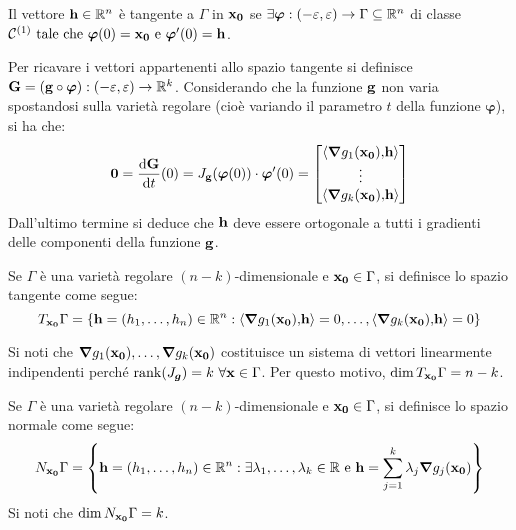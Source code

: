 \begin{definition}
    Il vettore $\vb{h} \in \mathbb{R}^n$ è tangente a $\Gamma$ in $\vb{x_0}$ se $\exists \bm\varphi: (-\varepsilon, \varepsilon) \to \Gamma \subseteq \mathbb{R}^n$ di classe $\mathcal{C}^{(1)} \text{ tale che } \bm\varphi (0) = \vb{x_0} \text{ e } \bm\varphi ' (0) = \vb{h}$.
\end{definition}

Per ricavare i vettori appartenenti allo spazio tangente si definisce $\vb{G}=(\vb{g}\circ\bm\varphi):(-\varepsilon,\varepsilon)\to\mathbb{R}^k$. Considerando che la funzione $\vb{g}$ non varia spostandosi sulla varietà regolare (cioè variando il parametro $t$ della funzione $\bm\varphi$), si ha che:
$$
    \vb{0}=\frac{\dd \vb{G}}{\dd t}(0)=J_{\vb{g}}(\bm\varphi(0))\cdot \bm\varphi'(0)=
    \begin{bmatrix}
        \left\langle\grad g_1(\vb{x_0}){,}\vb{h}\right\rangle\\
        \vdots\\
        \left\langle\grad g_k(\vb{x_0}){,}\vb{h}\right\rangle
    \end{bmatrix}
$$
Dall'ultimo termine si deduce che $\vb{h}$ deve essere ortogonale a tutti i gradienti delle componenti della funzione $\vb{g}$.

\begin{definition}
    Se $\Gamma$ è una varietà regolare $(n-k)$-dimensionale e $\vb{x_0} \in \Gamma$, si definisce lo spazio tangente come segue:
    $$
        T_{\vb{x_0}}\Gamma = \{ \vb{h}=(h_1,\dots,h_n) \in \mathbb{R}^n : \left\langle\grad g_1(\vb{x_0}){,}\vb{h}\right\rangle=0,\dots,\left\langle\grad g_k(\vb{x_0}){,}\vb{h}\right\rangle=0 \}
    $$
\end{definition}

\begin{remark}
    Si noti che $\grad g_1(\vb{x_0}),\dots,\grad g_k (\vb{x_0})$ costituisce un sistema di vettori linearmente indipendenti perché $\rank(J_{\bm g})=k \ \forall \vb{x} \in \Gamma$. Per questo motivo, $\dim T_{\vb{x_0}}\Gamma= n-k$.
\end{remark}

\begin{definition}
    Se $\Gamma$ è una varietà regolare $(n-k)$-dimensionale e $\vb{x_0} \in \Gamma$, si definisce lo spazio normale come segue:
    $$
        N_{\vb{x_0}}\Gamma = \left\{ \vb{h}=(h_1,\dots,h_n) \in \mathbb{R}^n : \exists \lambda_1, \dots, \lambda_k \in \mathbb{R} \text{ e } \vb{h}=\sum_{j=1}^k \lambda_j \grad g_j(\vb{x_0}) \right\}
    $$
    Si noti che $\dim N_{\vb{x_0}}\Gamma = k$.
\end{definition}

